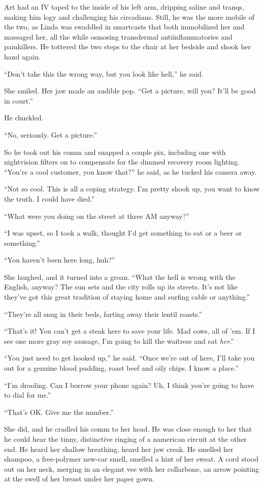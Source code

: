 Art had an IV taped to the inside of his left arm, dripping saline
and tranqs, making him logy and challenging his circadians. Still,
he was the more mobile of the two, as Linda was swaddled in
smartcasts that both immobilized her and massaged her, all the
while osmosing transdermal antiinflammatories and painkillers. He
tottered the two steps to the chair at her bedside and shook her
hand again.

“Don’t take this the wrong way, but you look like hell,” he said.

She smiled. Her jaw made an audible pop. “Get a picture, will you?
It’ll be good in court.”

He chuckled.

“No, seriously. Get a picture.”

So he took out his comm and snapped a couple pix, including one
with nightvision filters on to compensate for the dimmed recovery
room lighting. “You’re a cool customer, you know that?” he said, as
he tucked his camera away.

“Not so cool. This is all a coping strategy. I’m pretty shook up,
you want to know the truth. I could have died.”

“What were you doing on the street at three AM anyway?”

“I was upset, so I took a walk, thought I’d get something to eat or
a beer or something.”

“You haven’t been here long, huh?”

She laughed, and it turned into a groan. “What the hell is wrong
with the English, anyway? The sun sets and the city rolls up its
streets. It’s not like they’ve got this great tradition of staying
home and surfing cable or anything.”

“They’re all snug in their beds, farting away their lentil
roasts.”

“That’s it! You can’t get a steak here to save your life. Mad cows,
all of ’em. If I see one more gray soy sausage, I’m going to kill
the waitress and eat \emph{her}.”

“You just need to get hooked up,” he said. “Once we’re out of here,
I’ll take you out for a genuine blood pudding, roast beef and oily
chips. I know a place.”

“I’m drooling. Can I borrow your phone again? Uh, I think you’re
going to have to dial for me.”

“That’s OK. Give me the number.”

She did, and he cradled his comm to her head. He was close enough
to her that he could hear the tinny, distinctive ringing of a
namerican circuit at the other end. He heard her shallow breathing,
heard her jaw creak. He smelled her shampoo, a free-polymer new-car
smell, smelled a hint of her sweat. A cord stood out on her neck,
merging in an elegant vee with her collarbone, an arrow pointing at
the swell of her breast under her paper gown.

